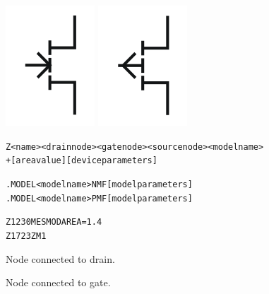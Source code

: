 


\begin{Device}\label{Z_DEVICE}

\symbol
{\includegraphics{nmesfetSymbol}}
{\includegraphics{pmesfetSymbol}}

\device
\begin{alltt}
Z<name> < drain node> <gate node> <source node> <model name>
+ [area value] [device parameters]
\end{alltt}

\model
\begin{alltt}
.MODEL <model name> NMF [model parameters]
.MODEL <model name> PMF [model parameters]
\end{alltt}

\examples
\begin{alltt}
Z1 2 3 0 MESMOD AREA=1.4
Z1 7 2 3 ZM1
\end{alltt}

\parameters

\begin{Parameters}

Node connected to drain.

Node connected to gate.


\end{Parameters}
\end{Device}
